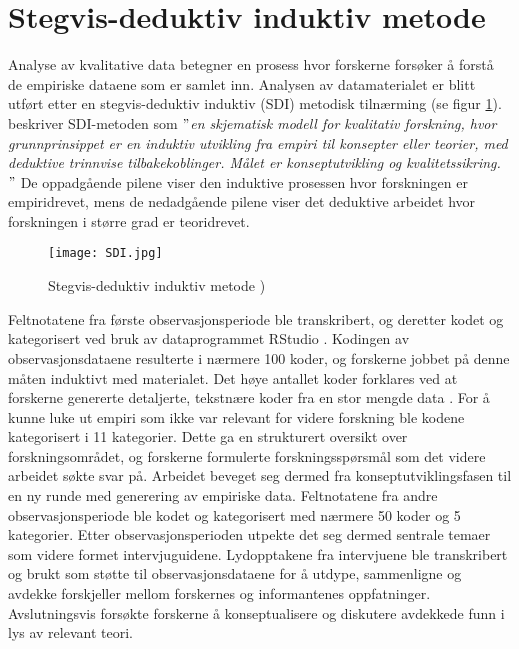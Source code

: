 \section{Stegvis-deduktiv induktiv metode}
\label{section:sdi} 
Analyse av kvalitative data betegner en prosess hvor forskerne forsøker å forstå de empiriske dataene som er samlet inn. Analysen av datamaterialet er blitt utført etter en stegvis-deduktiv induktiv (SDI) metodisk tilnærming (se figur \ref{SDI}). \citet{Tjora} beskriver SDI-metoden som \textit{$"$en skjematisk modell for kvalitativ forskning, hvor grunnprinsippet er en induktiv utvikling fra empiri til konsepter eller teorier, med deduktive trinnvise tilbakekoblinger. Målet er konseptutvikling og kvalitetssikring. $"$} De oppadgående pilene viser den induktive prosessen hvor forskningen er empiridrevet, mens de nedadgående pilene viser det deduktive arbeidet hvor forskningen i større grad er teoridrevet.

\begin{figure}[H]
\centering
\texttt{[image: SDI.jpg]}
\caption{Stegvis-deduktiv induktiv metode \citep{Tjora})}
\label{SDI}
\end{figure}

\noindent
Feltnotatene fra første observasjonsperiode ble transkribert, og deretter kodet og kategorisert ved bruk av dataprogrammet RStudio \citep{Rstudio}. Kodingen av observasjonsdataene resulterte i nærmere 100 koder, og forskerne jobbet på denne måten induktivt med materialet. Det høye antallet koder forklares ved at forskerne genererte detaljerte, tekstnære koder fra en stor mengde data \citep{Tjora}. For å kunne luke ut empiri som ikke var relevant for videre forskning ble kodene kategorisert i 11 kategorier. Dette ga en strukturert oversikt over forskningsområdet, og forskerne formulerte forskningsspørsmål som det videre arbeidet søkte svar på. Arbeidet beveget seg dermed fra konseptutviklingsfasen til en ny runde med generering av empiriske data. Feltnotatene fra andre observasjonsperiode ble kodet og kategorisert med nærmere 50 koder og 5 kategorier. Etter observasjonsperioden utpekte det seg dermed sentrale temaer som videre formet intervjuguidene. Lydopptakene fra intervjuene ble transkribert og brukt som støtte til observasjonsdataene for å utdype, sammenligne og avdekke forskjeller mellom forskernes og informantenes oppfatninger. Avslutningsvis forsøkte forskerne å konseptualisere og diskutere avdekkede funn i lys av relevant teori. 


